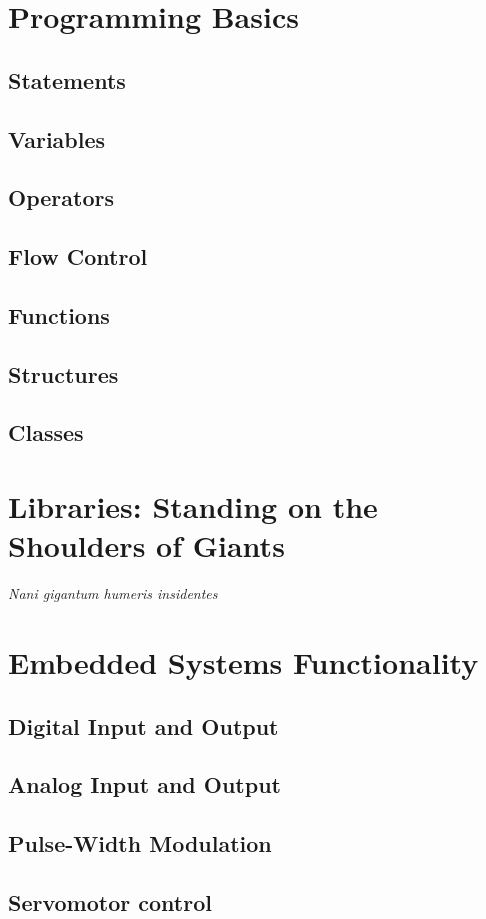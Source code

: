 \documentclass[letterpaper, 11pt]{memoir}
\begin{document}



\chapter{Programming Basics}
\section{Statements}
\section{Variables}
\section{Operators}
\section{Flow Control}
\section{Functions}
\section{Structures}
\section{Classes}

\chapter{Libraries: Standing on the Shoulders of Giants}
\emph{Nani gigantum humeris insidentes}

\chapter{Embedded Systems Functionality}
\section{Digital Input and Output}
\section{Analog Input and Output}
\section{Pulse-Width Modulation}
\section{Servomotor control}

\printbibliography
\end{document}
